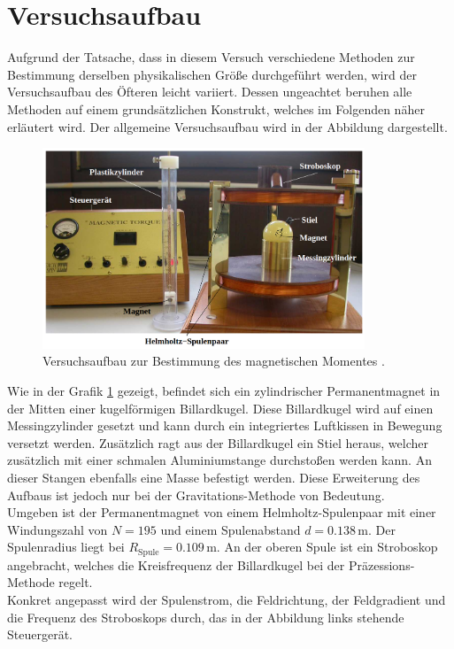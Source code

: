 


\section{Versuchsaufbau}

\noindent Aufgrund der Tatsache, dass in diesem Versuch verschiedene Methoden zur Bestimmung derselben physikalischen Größe 
durchgeführt werden, wird der Versuchsaufbau des Öfteren leicht variiert. Dessen ungeachtet beruhen alle Methoden auf 
einem grundsätzlichen Konstrukt, welches im Folgenden näher erläutert wird. Der allgemeine Versuchsaufbau wird in der 
Abbildung dargestellt.

\begin{figure}[H]
    \centering
    \includegraphics[height=6cm]{aufbau.png}
    \caption{Versuchsaufbau zur Bestimmung des magnetischen Momentes \cite{Versuchsanleitung_v105}.}
    \label{fig:aufbau_moment}
\end{figure}

\noindent Wie in der Grafik \ref{fig:aufbau_moment} gezeigt, befindet sich ein zylindrischer Permanentmagnet in der Mitten einer 
kugelförmigen Billardkugel. Diese Billardkugel wird auf einen Messingzylinder gesetzt und kann durch ein integriertes Luftkissen
in Bewegung versetzt werden. Zusätzlich ragt aus der Billardkugel ein Stiel heraus, welcher zusätzlich mit einer schmalen 
Aluminiumstange durchstoßen werden kann. An dieser Stangen ebenfalls eine Masse befestigt werden. Diese Erweiterung des Aufbaus 
ist jedoch nur bei der Gravitations-Methode von Bedeutung.\\
Umgeben ist der Permanentmagnet von einem Helmholtz-Spulenpaar mit einer Windungszahl von $N = 195$ und einem Spulenabstand 
$d = 0.138\,\unit{\meter}$. Der Spulenradius liegt bei $R_\text{Spule} = 0.109\,\unit{\meter}$. An der oberen Spule ist 
ein Stroboskop angebracht, welches die Kreisfrequenz der Billardkugel bei der Präzessions-Methode regelt.\\
Konkret angepasst wird der Spulenstrom, die Feldrichtung, der Feldgradient und die Frequenz des Stroboskops durch, das in der 
Abbildung links stehende Steuergerät.


